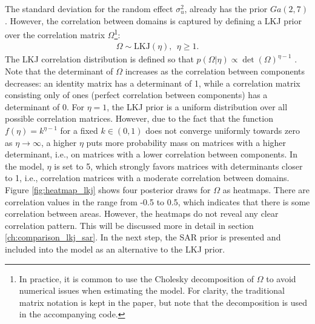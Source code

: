 The standard deviation for the random effect $\sigma_u^2$, already has the prior $Ga(2, 7)$.
However, the correlation between domains is captured by defining a LKJ prior over the correlation matrix $\Omega$\footnote{In practice, it is common to use the Cholesky decomposition of $\Omega$ to avoid numerical issues when estimating the model.
For clarity, the traditional matrix notation is kept in the paper, but note that the decomposition is used in the accompanying code.}:
\begin{gather*}
    \Omega \sim \text{LKJ}(\eta), ~~ \eta \ge 1.
\end{gather*}
The LKJ correlation distribution is defined so that $p(\Omega|\eta) \propto \det(\Omega)^{\eta - 1}$ \citep[Chapter 1.13]{stan_development_team_stan_2021}.
Note that the determinant of $\Omega$ increases as the correlation between components decreases:
an identity matrix has a determinant of 1, while a correlation matrix consisting only of ones (perfect correlation between components) has a determinant of 0.
For $\eta = 1$, the LKJ prior is a uniform distribution over all possible correlation matrices.
However, due to the fact that the function $f(\eta) = k^{\eta-1}$ for a fixed $k \in (0, 1)$ does not converge uniformly towards zero as $\eta \rightarrow \infty$, a higher $\eta$ puts more probability mass on matrices with a higher determinant, i.e., on matrices with a lower correlation between components.
In the model, $\eta$ is set to 5, which strongly favors matrices with determinants closer to 1, i.e., correlation matrices with a moderate correlation between domains.
Figure \ref{fig:heatmap_lkj} shows four posterior draws for $\Omega$ as heatmaps.
There are correlation values in the range from -0.5 to 0.5, which indicates that there is some correlation between areas.
However, the heatmaps do not reveal any clear correlation pattern.
This will be discussed more in detail in section \ref{ch:comparison_lkj_sar}.
In the next step, the SAR prior is presented and included into the model as an alternative to the LKJ prior.






